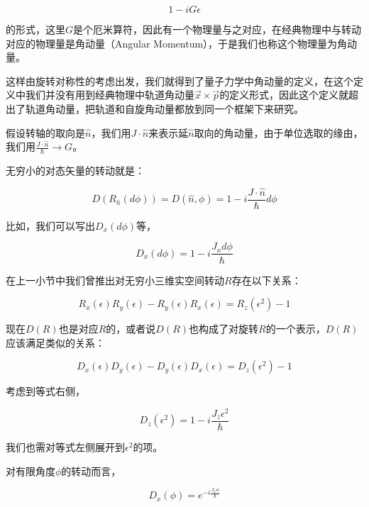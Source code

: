 \begin{equation*}
1 - iG \epsilon
\end{equation*}

的形式，这里$G$是个厄米算符，因此有一个物理量与之对应，在经典物理中与转动对应的物理量是角动量（Angular Momentum），于是我们也称这个物理量为角动量。

这样由旋转对称性的考虑出发，我们就得到了量子力学中角动量的定义，在这个定义中我们并没有用到经典物理中轨道角动量$\vec x \times \vec p$的定义形式，因此这个定义就超出了轨道角动量，把轨道和自旋角动量都放到同一个框架下来研究。

假设转轴的取向是$\hat n$，我们用$J \cdot {\hat n}$来表示延$\hat n$取向的角动量，由于单位选取的缘由，我们用$\frac{J \cdot {\hat n}}{\hbar} \to G$。

无穷小的对态矢量的转动就是：

\begin{equation}
D( R_{\hat n}( d \phi) ) = D (\hat n, \phi) = 1 - i \frac{ J \cdot \hat n}{ \hbar} d \phi
\end{equation}

比如，我们可以写出$D_x (d \phi)$等，

\begin{equation}
D_x(d \phi) = 1 - i \frac{J_x d \phi }{ \hbar }
\end{equation}

在上一小节中我们曾推出对无穷小三维实空间转动$R$存在以下关系：

\begin{equation*}
R_x (\epsilon) R_y (\epsilon) - R_y (\epsilon) R_x (\epsilon) = R_z ( \epsilon^2 ) - 1
\end{equation*}

现在$D(R)$也是对应$R$的，或者说$D(R)$也构成了对旋转$R$的一个表示，$D(R)$应该满足类似的关系：

\begin{equation}
D_x(\epsilon) D_y(\epsilon) - D_y(\epsilon)  D_x(\epsilon)  = D_z(\epsilon^2 ) - 1  
\end{equation}

考虑到等式右侧，

\begin{equation*}
D_z( \epsilon^2 ) = 1 - i \frac{ J_z \epsilon^2 }{ \hbar}
\end{equation*}

我们也需对等式左侧展开到$\epsilon^2$的项。

对有限角度$\phi$的转动而言， 

\begin{equation}
D_x( \phi ) = e^{- i \frac{J_x \phi }{ \hbar }}
\end{equation}

